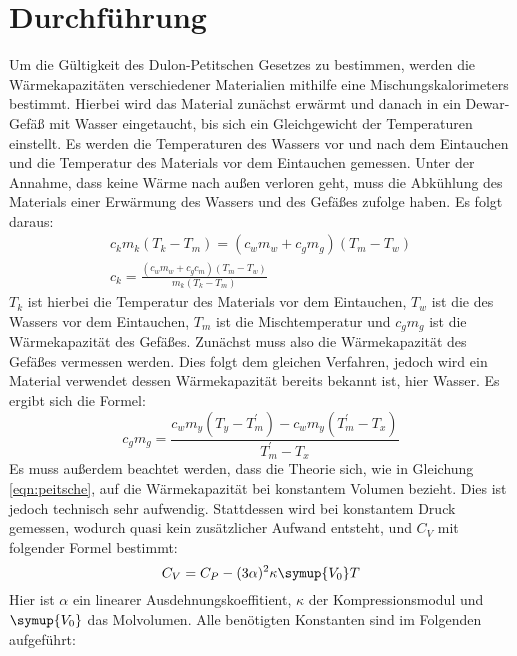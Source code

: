 \section{Durchführung}
\label{sec:Durchführung}
Um die Gültigkeit des Dulon-Petitschen Gesetzes zu bestimmen, werden die Wärmekapazitäten verschiedener Materialien 
mithilfe eine Mischungskalorimeters bestimmt.
Hierbei wird das Material zunächst erwärmt und danach in ein Dewar-Gefäß mit Wasser eingetaucht, 
bis sich ein Gleichgewicht der Temperaturen einstellt. 
Es werden die Temperaturen des Wassers vor und nach dem Eintauchen und die Temperatur des Materials vor dem Eintauchen gemessen.
Unter der Annahme, dass keine Wärme nach außen verloren geht, 
muss die Abkühlung des Materials einer Erwärmung des Wassers und des Gefäßes zufolge haben.
Es folgt daraus:
\begin{gather}
    c_km_k(T_k-T_m) = (c_wm_w + c_gm_g)(T_m - T_w) \\
    c_k = \frac{(c_wm_w + c_gc_m)(T_m - T_w)}{m_k(T_k - T_m)}
\end{gather}
$T_k$ ist hierbei die Temperatur des Materials vor dem Eintauchen, $T_w$ ist die des Wassers vor dem Eintauchen, 
$T_m$ ist die Mischtemperatur und $c_gm_g$ ist die Wärmekapazität des Gefäßes.
Zunächst muss also die Wärmekapazität des Gefäßes vermessen werden. Dies folgt dem gleichen Verfahren, jedoch wird ein Material verwendet
dessen Wärmekapazität bereits bekannt ist, hier Wasser.
Es ergibt sich die Formel:
\begin{equation}
    \label{eqn:gefaess}
    c_gm_g = \frac{c_wm_y\left(T_y - T^{\prime}_m\right) - c_wm_y\left(T^{\prime}_m - T_x\right)}{T^{\prime}_m - T_x}
\end{equation}
Es muss außerdem beachtet werden, dass die Theorie sich, wie in Gleichung \eqref{eqn:peitsche}, 
auf die Wärmekapazität bei konstantem Volumen bezieht.
Dies ist jedoch technisch sehr aufwendig. Stattdessen wird bei konstantem Druck gemessen, 
wodurch quasi kein zusätzlicher Aufwand entsteht, und $C_V$ mit folgender Formel bestimmt:
\begin{equation}
    C_V = C_P - (3\alpha)^2\kappa\symup{V_0}T
\end{equation}
Hier ist $\alpha$ ein linearer Ausdehnungskoeffitient, $\kappa$ der Kompressionsmodul und $\symup{V_0}$ das Molvolumen.
Alle benötigten Konstanten sind im Folgenden aufgeführt:
